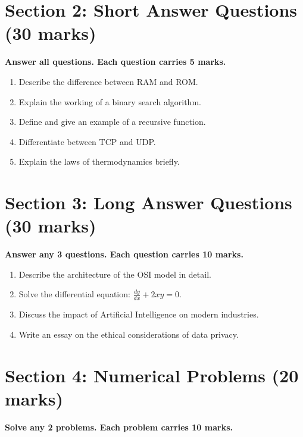\documentclass[a4paper,12pt]{article}   %
\begin{document}
	\vspace{0.5cm}
	
	\section*{Section 2: Short Answer Questions (30 marks)}
	\noindent\textbf{Answer all questions. Each question carries 5 marks.}
	
	\begin{enumerate}
		\item Describe the difference between RAM and ROM.
		\item Explain the working of a binary search algorithm.
		\item Define and give an example of a recursive function.
		\item Differentiate between TCP and UDP.
		\item Explain the laws of thermodynamics briefly.
	\end{enumerate}
	
	\vspace{0.5cm}
	
	\section*{Section 3: Long Answer Questions (30 marks)}
	\noindent\textbf{Answer any 3 questions. Each question carries 10 marks.}
	
	\begin{enumerate}
		\item Describe the architecture of the OSI model in detail.
		\item Solve the differential equation: \( \frac{dy}{dx} + 2xy = 0 \).
		\item Discuss the impact of Artificial Intelligence on modern industries.
		\item Write an essay on the ethical considerations of data privacy.
	\end{enumerate}
	
	\vspace{0.5cm}
	
	\section*{Section 4: Numerical Problems (20 marks)}
	\noindent\textbf{Solve any 2 problems. Each problem carries 10 marks.}
	
\end{document}
